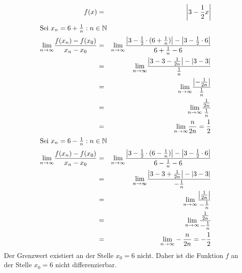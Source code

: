 \documentclass[10pt,a4paper,oneside,ngerman,numbers=noenddot]{scrartcl}
\begin{document}
\section{} %
\begin{alignat*}{2}
f(x) &=& \left| 3 - \frac{1}{2}x \right| \\
\intertext{Sei $x_{n} = 6 + \frac{1}{n} : n \in \mathbb{N}$}
\underset{n \rightarrow \infty}{\text{lim}} \frac{f(x_{n}) - f(x_{0})}{x_{n} - x_{0}} &=& \underset{n \rightarrow \infty}{\text{lim}} \frac{\left| 3 - \frac{1}{2} \cdot (6 + \frac{1}{n}) \right| - \left| 3 - \frac{1}{2} \cdot 6 \right|}{6 + \frac{1}{n} - 6} \\
&=& \underset{n \rightarrow \infty}{\text{lim}} \frac{\left| 3 - 3 - \frac{1}{2n} \right| - \left| 3 - 3 \right|}{\frac{1}{n}} \\
&=& \underset{n \rightarrow \infty}{\text{lim}} \frac{\left|-\frac{1}{2n} \right|}{\frac{1}{n}} \\
&=& \underset{n \rightarrow \infty}{\text{lim}} \frac{\frac{1}{2n}}{\frac{1}{n}} \\
&=& \underset{n \rightarrow \infty}{\text{lim}} \frac{n}{2n} = \frac{1}{2} \\
\intertext{Sei $x_{n} = 6 - \frac{1}{n} : n \in \mathbb{N}$}
\underset{n \rightarrow \infty}{\text{lim}} \frac{f(x_{n}) - f(x_{0})}{x_{n} - x_{0}} &=& \underset{n \rightarrow \infty}{\text{lim}} \frac{\left| 3 - \frac{1}{2} \cdot (6 - \frac{1}{n}) \right| - \left| 3 - \frac{1}{2} \cdot 6 \right|}{6 - \frac{1}{n} - 6} \\
&=& \underset{n \rightarrow \infty}{\text{lim}} \frac{\left| 3 - 3 + \frac{1}{2n} \right| - \left| 3 - 3 \right|}{-\frac{1}{n}} \\
&=& \underset{n \rightarrow \infty}{\text{lim}} \frac{\left|\frac{1}{2n} \right|}{-\frac{1}{n}} \\
&=& \underset{n \rightarrow \infty}{\text{lim}} \frac{\frac{1}{2n}}{-\frac{1}{n}} \\
&=& \underset{n \rightarrow \infty}{\text{lim}} -\frac{n}{2n} = -\frac{1}{2}
\end{alignat*}
Der Grenzwert existiert an der Stelle $x _{0} = 6$ nicht. Daher ist die Funktion $f$ an der Stelle $x_{0} = 6$ nicht differenzierbar.

\end{document}
